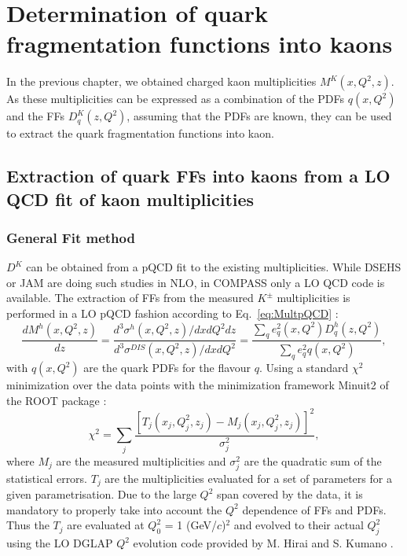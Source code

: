 
\chapter{Determination of quark fragmentation functions into kaons} %

\label{ch:FF} %


In the previous chapter, we obtained charged kaon multiplicities $M^K(x,Q^2,z)$. As these multiplicities can be expressed as a combination of the PDFs $q(x,Q^2)$ and the FFs $D^K_q(z,Q^2)$, assuming that the PDFs are known, they can be used to extract the quark fragmentation functions into kaon.



\section{Extraction of quark FFs into kaons from a LO QCD fit of kaon multiplicities}

\subsection{General Fit method}

$D^K$ can be obtained from a pQCD fit to the existing multiplicities. While DSEHS or JAM are doing such studies in NLO, in COMPASS only a LO QCD code is available. The extraction of FFs from the measured $K^{\pm}$ multiplicities is performed in a LO pQCD fashion according to Eq.~\ref{eq:MultpQCD} :
%
\begin{equation}
  \frac{dM^h(x,Q^2,z)}{dz} = \frac{d^3\sigma^h(x,Q^2,z)/dxdQ^2dz}{d^3\sigma^{DIS}(x,Q^2,z)/dxdQ^2} = \frac{\sum_q e^2_q(x,Q^2)D^h_q(z,Q^2)}{\sum_q e^2_qq(x,Q^2)},
\end{equation}
%
with $q(x,Q^2)$ are the quark PDFs for the flavour $q$. Using a standard $\chi^2$ minimization over the data points with the minimization framework Minuit2 of the ROOT package :
%
\begin{equation} \label{eq:MultpQCD}
  \chi^2 = \sum_j \frac{\left[T_j\left(x_j,Q^2_j,z_j\right) - M_j\left(x_j,Q^2_j,z_j\right)\right]^2}{\sigma^2_j},
\end{equation}
%
where $M_j$ are the measured multiplicities and $\sigma^2_j$ are the quadratic sum of the statistical errors. $T_j$ are the multiplicities evaluated for a set of parameters for a given parametrisation. Due to the large $Q^2$ span covered by the data, it is mandatory to properly take into account the $Q^2$ dependence of FFs and PDFs. Thus the $T_j$ are evaluated at $Q^2_0$ = 1 (GeV/$c$)$^2$ and evolved to their actual $Q^2_j$ using the LO DGLAP $Q^2$ evolution code provided by M. Hirai and S. Kumano \cite{HKNS}.

